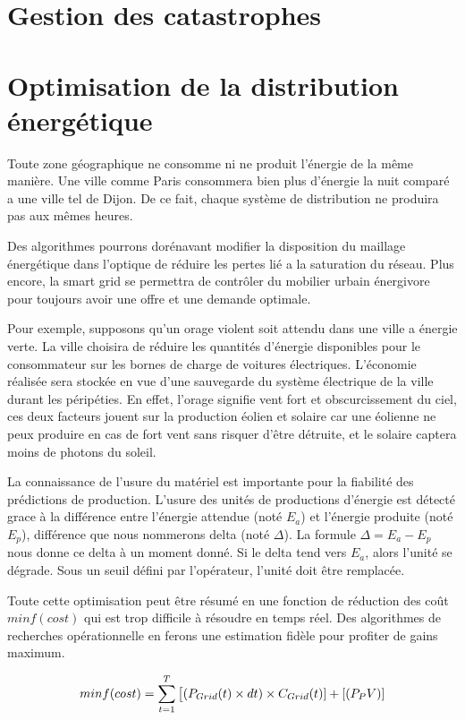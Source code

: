 \section{Gestion des catastrophes}
\section{Optimisation de la distribution énergétique}

Toute zone géographique ne consomme ni ne produit l'énergie de la même manière.
Une ville comme Paris consommera bien plus d'énergie la nuit comparé a une ville tel de Dijon.
De ce fait, chaque système de distribution ne produira pas aux mêmes heures.

Des algorithmes pourrons dorénavant modifier la disposition du maillage énergétique dans l'optique
de réduire les pertes lié a la saturation du réseau. Plus encore, la smart grid se permettra de contrôler
du mobilier urbain énergivore pour toujours avoir une offre et une demande optimale.

Pour exemple, supposons qu'un orage violent soit attendu dans une ville a énergie verte.
La ville choisira de réduire les quantités d'énergie disponibles pour le consommateur sur les bornes
de charge de voitures électriques.
L'économie réalisée sera stockée en vue d'une sauvegarde du système électrique de la ville durant les péripéties.
En effet, l'orage signifie vent fort et obscurcissement du ciel, ces deux facteurs jouent sur la production
éolien et solaire car une éolienne ne peux produire en cas de fort vent sans risquer d'être détruite, et le solaire
captera moins de photons du soleil.

La connaissance de l'usure du matériel est importante pour la fiabilité des prédictions de production.
L'usure des unités de productions d'énergie est détecté grace à la différence entre l'énergie attendue
(noté $E_a$) et l'énergie produite (noté $E_p$), différence que nous nommerons delta (noté $\Delta$).
La formule $\Delta = E_a - E_p$ nous donne ce delta à un moment donné.
Si le delta tend vers $E_a$, alors l'unité se dégrade. Sous un seuil défini par l'opérateur,
l'unité doit être remplacée.

Toute cette optimisation peut être résumé en une fonction de réduction des coût $min f(cost)$ qui est trop difficile
à résoudre en temps réel. Des algorithmes de recherches opérationnelle en ferons une estimation fidèle
pour profiter de gains maximum.

\begin{equation}
  min f(cost) = \sum^{T}_{t = 1}\big{
    [(P_{Grid}(t) \times dt) \times C_{Grid}(t)] +
    [(P_PV)]
  }
\end{equation}

